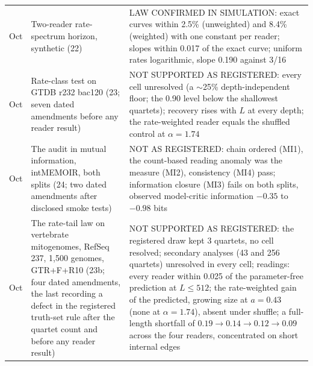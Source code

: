 \documentclass[11pt]{article}
\begin{document}
{\begin{longtable}{@{}>{\raggedright\arraybackslash}p{1.4cm}>{\raggedright\arraybackslash}p{4.3cm}>{\raggedright\arraybackslash}p{8.5cm}@{}}
14 Oct & Two-reader rate-spectrum horizon, synthetic (22) & LAW CONFIRMED IN SIMULATION: exact curves within 2.5\% (unweighted) and 8.4\% (weighted) with one constant per reader; slopes within 0.017 of the exact curve; uniform rates logarithmic, slope 0.190 against 3/16 \\
14 Oct & Rate-class test on GTDB r232 bac120 (23; seven dated amendments before any reader result) & NOT SUPPORTED AS REGISTERED: every cell unresolved (a $\sim$25\% depth-independent floor; the 0.90 level below the shallowest quartets); recovery rises with $L$ at every depth; the rate-weighted reader equals the shuffled control at $\alpha=1.74$ \\
14 Oct & The audit in mutual information, intMEMOIR, both splits (24; two dated amendments after disclosed smoke tests) & NOT AS REGISTERED: chain ordered (MI1), the count-based reading anomaly was the measure (MI2), consistency (MI4) pass; information closure (MI3) fails on both splits, observed model-critic information $-0.35$ to $-0.98$ bits \\
14 Oct & The rate-tail law on vertebrate mitogenomes, RefSeq 237, 1,500 genomes, GTR+F+R10 (23b; four dated amendments, the last recording a defect in the registered truth-set rule after the quartet count and before any reader result) & NOT SUPPORTED AS REGISTERED: the registered draw kept 3 quartets, no cell resolved; secondary analyses (43 and 256 quartets) unresolved in every cell; readings: every reader within 0.025 of the parameter-free prediction at $L\le512$; the rate-weighted gain of the predicted, growing size at $a=0.43$ (none at $\alpha=1.74$), absent under shuffle; a full-length shortfall of $0.19\to0.14\to0.12\to0.09$ across the four readers, concentrated on short internal edges \\
\bottomrule
\end{longtable}}
\end{document}
